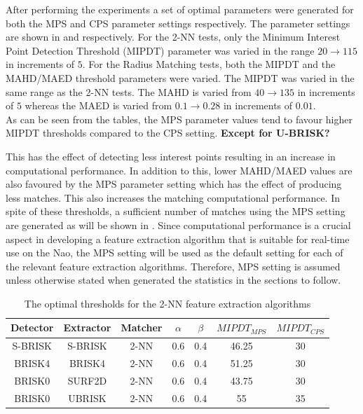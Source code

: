 \documentclass{report}
\begin{document}
After performing the experiments a set of optimal parameters were generated for both the MPS and CPS parameter settings respectively. The parameter settings are shown in  and  respectively. For the 2-NN tests, only the Minimum Interest Point Detection Threshold (MIPDT) parameter was varied in the range $20 \rightarrow 115$ in increments of $5$. For the Radius Matching tests, both the MIPDT and the MAHD/MAED threshold parameters were varied. The MIPDT was varied in the same range as the 2-NN tests. The MAHD is varied from $40 \rightarrow 135$ in increments of $5$ whereas the MAED is varied from $0.1 \rightarrow 0.28$ in increments of $0.01$.\\

As can be seen from the tables, the MPS parameter values tend to favour higher MIPDT thresholds compared to the CPS setting. 
\textbf{Except for U-BRISK?}

This has the effect of detecting less interest points resulting in an increase in computational performance. In addition to this, lower MAHD/MAED values are also favoured by the MPS parameter setting which has the effect of producing less matches. This also increases the matching computational performance. In spite of these thresholds, a sufficient number of matches using the MPS setting are generated as will be shown in . Since computational performance is a crucial aspect in developing a feature extraction algorithm that is suitable for real-time use on the Nao, the MPS setting will be used as the default setting for each of the relevant feature extraction algorithms. Therefore, MPS setting is assumed unless otherwise stated when generated the statistics in the sections to follow.\\

\begin{table}
\caption{The optimal thresholds for the 2-NN feature extraction algorithms}
\footnotesize
\begin{tabular}{|c|c|c|c|c|c|c|}
\hline 
Detector & Extractor & Matcher & $\alpha$ & $\beta$ & $MIPDT_{MPS}$ & $MIPDT_{CPS}$\tabularnewline
\hline 
\hline 
S-BRISK & S-BRISK & 2-NN & 0.6 & 0.4 & 46.25 & 30\tabularnewline
\hline 
BRISK4 & BRISK4 & 2-NN & 0.6 & 0.4 & 51.25 & 30\tabularnewline
\hline 
BRISK0 & SURF2D & 2-NN & 0.6 & 0.4 & 43.75 & 30\tabularnewline
\hline 
BRISK0 & UBRISK & 2-NN & 0.6 & 0.4 & 55 & 35\tabularnewline
\hline 
\end{tabular}
\label{tab:knnStatistics}
\end{table}
\end{document}
